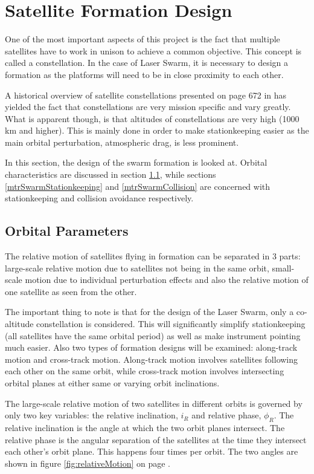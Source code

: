 \clearpage
\section{Satellite Formation Design}
\label{mtrSwarmDesign}
One of the most important aspects of this project is the fact that multiple satellites have to work in unison to achieve a common objective. This concept is called a constellation. In the case of Laser Swarm, it is necessary to design a formation as the platforms will need to be in close proximity to each other. 

A historical overview of satellite constellations presented on page 672 in \cite{constDesign} has yielded the fact that constellations are very mission specific and vary greatly. What is apparent though, is that altitudes of constellations are very high (1000 km and higher). This is mainly done in order to make stationkeeping easier as the main orbital perturbation, atmospheric drag, is less prominent.

In this section, the design of the swarm formation is looked at. Orbital characteristics are discussed in section \ref{mtrSwarmOrbitalParams}, while sections \ref{mtrSwarmStationkeeping} and \ref{mtrSwarmCollision} are concerned with stationkeeping and collision avoidance respectively. 
\subsection{Orbital Parameters}
\label{mtrSwarmOrbitalParams}

The relative motion of satellites flying in formation can be separated in 3 parts: large-scale relative motion due to satellites not being in the same orbit, small-scale motion due to individual perturbation effects and also the relative motion of one satellite as seen from the other.

The important thing to note is that for the design of the Laser Swarm, only a co-altitude constellation is considered. This will significantly simplify stationkeeping (all satellites have the same orbital period) as well as make instrument pointing much easier. Also two types of formation designs will be examined: along-track motion and cross-track motion. Along-track motion involves satellites following each other on the same orbit, while cross-track motion involves intersecting orbital planes at either same or varying orbit inclinations. 

The large-scale relative motion of two satellites in different orbits is governed by only two key variables: the relative inclination, $i_R$ and relative phase, $\phi_R$. The relative inclination is the angle at which the two orbit planes intersect. The relative phase is the angular separation of the satellites at the time they intersect each other's orbit plane. This happens four times per orbit. The two angles are shown in figure \ref{fig:relativeMotion} on page \pageref{fig:relativeMotion}.

